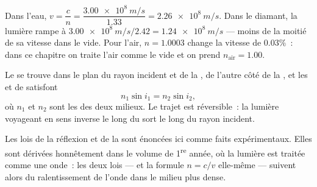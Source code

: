 \begin{example}\label{ex:g10:refraction:speed}
Dans l'eau, $v = \dfrac{c}{n} = \dfrac{\qty{3.00e8}{m/s}}{1.33}
= \qty{2.26e8}{m/s}$. Dans le diamant, la lumière rampe à
$\qty{3.00e8}{m/s}/2.42 = \qty{1.24e8}{m/s}$ --- moins de la moitié de
sa vitesse dans le vide. Pour l'air, $n = 1.0003$ change la vitesse de
$0.03\%$~: dans ce chapitre on traite l'air comme le vide et on prend
$n_{\text{air}} = 1.00$.
\end{example}

\begin{theorem}\label{thm:g10:refraction:snell}
Le  se trouve dans le plan du rayon incident et de
la , de l'autre côté de la , et les  et de  satisfont
\[
n_1 \sin i_1 = n_2 \sin i_2 ,
\]
où $n_1$ et $n_2$ sont les  des deux milieux. Le
trajet est réversible~: la lumière voyageant en sens inverse le long du
 sort le long du rayon incident.
\end{theorem}
\admitted

\begin{remark}\label{rem:g10:refraction:honest}
Les lois de la réflexion et de la  sont énoncées ici comme
faits expérimentaux. Elles sont dérivées honnêtement dans le volume de
1\textsuperscript{re} année, où la lumière est traitée comme une
onde~: les deux lois --- et la formule $n = c/v$ elle-même ---
suivent alors du ralentissement de l'onde dans le milieu plus dense.
\end{remark}

